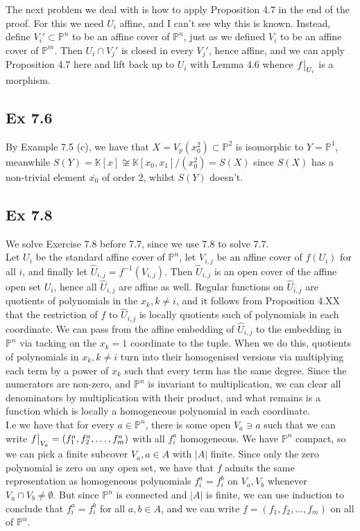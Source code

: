 \documentclass{article}
\newcommand\restr[2]{{%
  \left.\kern-\nulldelimiterspace %
  #1 %
  \vphantom{\big|} %
  \right|_{#2} %
  }}
\theoremstyle{definition}
\newcommand{\K}{\mathbb{K}}
\renewcommand{\P}{\mathbb{P}}
\newcommand{\PP}[1]{\P^{#1}}
\newcommand{\Pn}{\P^n}
\newcommand{\Pm}{\P^m}
\begin{document}
The next problem we deal with is how to apply Proposition 4.7 in the end of the
proof. For this we need $U_i$ affine, and I can't see why this is known.
Instead, define $V_i' \subset \Pn$ to be an affine cover of $\Pn$, just as we
defined $V_i$ to be an affine cover of $\Pm$. Then $U_i \cap V_j'$ is closed in
every $V_j'$, hence affine, and we can apply Proposition 4.7 here and lift back
up to $U_i$ with Lemma 4.6 whence $\restr{f}{U_i}$ is a morphism.

\subsection*{Ex 7.6}

By Example 7.5 (c), we have that $X = V_p(x_0^{2}) \subset \PP{2}$ is
isomorphic to $Y = \PP{1}$, meanwhile $S(Y) = \K[x] \not \cong \K[x_0,
x_1]/(x_0^{2}) = S(X)$ since $S(X)$ has a non-trivial element
$\overline{x_0}$ of order $2$, whilst $S(Y)$ doesn't.

\subsection*{Ex 7.8}

We solve Exercise 7.8 before 7.7, since we use 7.8 to solve 7.7. \\


Let $U_i$ be the standard affine cover of $\PP{n}$, let $V_{i, j}$ be an affine
cover of $f(U_i)$ for all $i$, and finally let $\hat{U}_{i, j} = f^{-1}(V_{i,
j})$. Then $\hat{U}_{i, j}$ is an open cover of the affine open set $U_i$,
hence all $\hat{U}_{i, j}$ are affine as well. Regular functions on
$\hat{U}_{i, j}$ are quotients of polynomials in the $x_k, k \not = i$, and it
follows from Proposition 4.XX that the restriction of $f$ to $\hat{U}_{i, j}$
is locally quotients such of polynomials in each coordinate. We can pass from
the affine embedding of $\hat{U}_{i, j}$ to the embedding in $\PP{n}$ via
tacking on the $x_k = 1$ coordinate to the tuple. When we do this, quotients of
polynomials in $x_k, k \not = i$ turn into their homogenised versions via
multiplying each term by a power of $x_k$ such that every term has the same
degree. Since the numerators are non-zero, and $\PP{n}$ is invariant to
multiplication, we can clear all denominators by multiplication with their
product, and what remains is a function which is locally a homogeneous
polynomial in each coordinate. \\

I.e we have that for every $a \in \PP{n}$, there is some open $V_a \ni a$ such
that we can write $\restr{f}{V_a} = (f_1^a, f_2^a, \ldots, f_m^a)$ with all
$f_i^a$ homogeneous. We have $\PP{n}$ compact, so we can pick a finite subcover
$V_a, a \in A$ with $|A|$ finite. Since only the zero polynomial is zero on any
open set, we have that $f$ admits the same representation as homogeneous
polynomials $f_i^a = f_i^b$ on $V_a, V_b$ whenever $V_a \cap V_b \not =
\emptyset$. But since $\PP{n}$ is connected and $|A|$ is finite, we can use
induction to conclude that $f_i^a = f_i^b$ for all $a, b \in A$, and we can
write $f = (f_1, f_2, \ldots, f_m)$ on all of $\PP{n}$.
\end{document}

